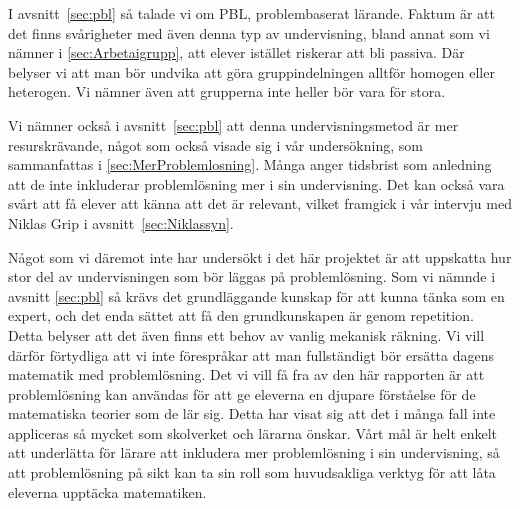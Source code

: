 \textcolor{Mahogany}{I avsnitt~\ref{sec:pbl} så talade vi om PBL, problembaserat lärande. Faktum är att det finns svårigheter med även denna typ av undervisning, bland annat som vi nämner i \ref{sec:Arbetaigrupp}, att elever istället riskerar att bli passiva. Där belyser vi att man bör undvika att göra gruppindelningen alltför homogen eller heterogen. Vi nämner även att grupperna inte heller bör vara för stora.}

\textcolor{Mahogany}{Vi nämner också i avsnitt~\ref{sec:pbl} att denna undervisningsmetod är mer resurskrävande, något som också visade sig i vår undersökning, som sammanfattas i \ref{sec:MerProblemlosning}. Många anger tidsbrist som anledning att de inte inkluderar problemlösning mer i sin undervisning. Det kan också vara svårt att få elever att känna att det är relevant, vilket framgick i vår intervju med Niklas Grip i avsnitt~\ref{sec:Niklassyn}.}

\textcolor{Mahogany}{Något som vi däremot inte har undersökt i det här projektet är att uppskatta hur stor del av undervisningen som bör läggas på problemlösning.} \textcolor{turkos}{Som vi nämnde i avsnitt \ref{sec:pbl} så krävs det grundläggande kunskap för att kunna tänka som en expert, och det enda sättet att få den grundkunskapen är genom repetition. }\textcolor{Mahogany}{Detta belyser att det även finns ett behov av vanlig mekanisk räkning. Vi vill därför förtydliga att vi inte förespråkar att man fullständigt bör ersätta dagens matematik med problemlösning. Det vi vill få fra av den här rapporten är att problemlösning kan användas för att ge eleverna en djupare förståelse för de matematiska teorier som de lär sig. Detta har visat sig att det i många fall inte appliceras så mycket som skolverket och lärarna önskar. Vårt mål är helt enkelt att underlätta för lärare att inkludera mer problemlösning i sin undervisning, så att problemlösning på sikt kan ta sin roll som huvudsakliga verktyg för att låta eleverna upptäcka matematiken.}